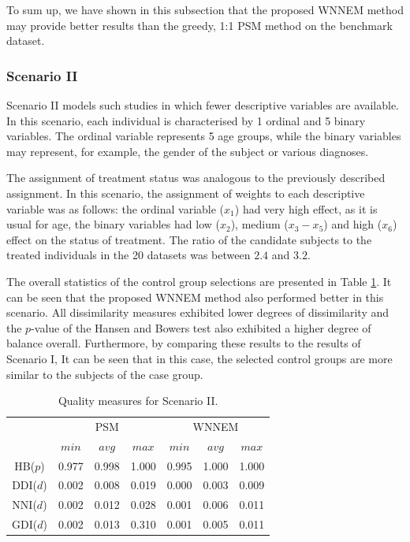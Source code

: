 		To sum up, we have shown in this subsection that the proposed WNNEM method may provide better results than the greedy, 1:1 PSM method on the benchmark dataset.
		        
		\subsubsection{Scenario II}
		\label{seq:wnnem_scen_2}
										
		Scenario II models such studies in which fewer descriptive variables are available. In this scenario, each individual is characterised by 1 ordinal and 5 binary variables. The ordinal variable represents 5 age groups, while the binary variables may represent, for example, the gender of the subject or various diagnoses.
										
		The assignment of treatment status was analogous to the previously described assignment. In this scenario, the assignment of weights to each descriptive variable was as follows: the ordinal variable ($x_1$) had very high effect, as it is usual for age, the binary variables had low ($x_2$), medium ($x_3-x_5$) and high ($x_6$) effect on the status of treatment. The ratio of the candidate subjects to the treated individuals in the 20 datasets was between $2.4$ and $3.2$. 
										
		The overall statistics of the control group selections are presented in Table \ref{tab:wnnem_scen_II_stat}. It can be seen that the proposed WNNEM method also performed better in this scenario. All dissimilarity measures exhibited lower degrees of dissimilarity and the $p$-value of the Hansen and Bowers test also exhibited a higher degree of balance overall. Furthermore, by comparing these results to the results of Scenario I, It can be seen that in this case, the selected control groups are more similar to the subjects of the case group.
										
		\begin{table}[h]
			\caption{Quality measures for Scenario II. %
			}
			\label{tab:wnnem_scen_II_stat}
			\centering
			\begin{tabular}{ccccccc} 
				\toprule
				& \multicolumn{3}{c}{PSM} 
				& \multicolumn{3}{c}{WNNEM}\\
				         & $min$ & $avg$ & $max$ & $min$ & $avg$ & $max$ \\
				\midrule
				HB($p$)  & 0.977 & 0.998 & 1.000 & 0.995 & 1.000 & 1.000 \\
				DDI($d$) & 0.002 & 0.008 & 0.019 & 0.000 & 0.003 & 0.009 \\
				\midrule
				NNI($d$) & 0.002 & 0.012 & 0.028 & 0.001 & 0.006 & 0.011 \\
				GDI($d$) & 0.002 & 0.013 & 0.310 & 0.001 & 0.005 & 0.011 \\
				\bottomrule
			\end{tabular}
		\end{table}
										
